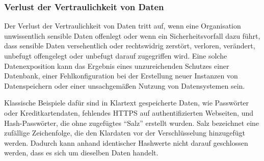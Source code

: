 \subsubsection{Verlust der Vertraulichkeit von Daten}

Der Verlust der Vertraulichkeit von  Daten tritt auf, wenn eine
Organisation unwissentlich sensible Daten offenlegt oder wenn ein
Sicherheitsvorfall dazu führt, dass sensible Daten versehentlich
oder rechtswidrig zerstört, verloren, verändert, unbefugt
offengelegt oder unbefugt darauf zugegriffen wird. Eine solche
Datenexposition kann das Ergebnis eines unzureichenden Schutzes einer
Datenbank, einer Fehlkonfiguration bei der Erstellung neuer Instanzen
von Datenspeichern oder einer unsachgemäßen Nutzung von Datensystemen sein.

Klassische Beispiele dafür sind in Klartext gespeicherte Daten, wie
Passwörter oder Kreditkartendaten, fehlendes HTTPS auf
authentifizierten Webseiten, und Hash-Passwörter, die ohne zugefügtes
“Salz” erstellt wurden. Salz bezeichnet eine zufällige Zeichenfolge,
die den Klardaten vor der Verschlüsselung hinzugefügt werden. Dadurch
kann anhand identischer Hashwerte nicht darauf geschlossen werden,
dass es sich um dieselben Daten handelt.